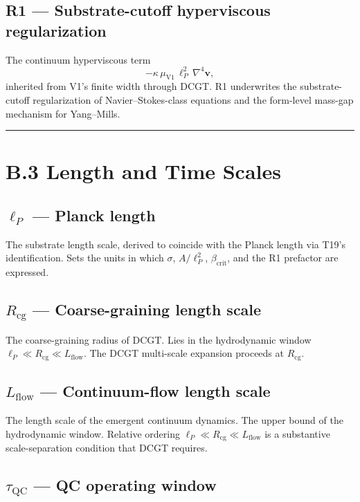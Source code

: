 \documentclass[11pt]{book}
\begin{document}
\subsection{R1 — Substrate-cutoff hyperviscous regularization}

The continuum hyperviscous term
\[
-\kappa\,\mu_\mathrm{V1}\,\ell_P^2\,\nabla^4\mathbf{v},
\]
inherited from V1's finite width through DCGT. R1 underwrites the substrate-cutoff regularization of Navier–Stokes-class equations and the form-level mass-gap mechanism for Yang–Mills.

\bigskip\hrule\bigskip

\section{B.3 Length and Time Scales}

\subsection{$\ell_P$ — Planck length}

The substrate length scale, derived to coincide with the Planck length via T19's identification. Sets the units in which $\sigma$, $A/\ell_P^2$, $\beta_\mathrm{crit}$, and the R1 prefactor are expressed.

\subsection{$R_\mathrm{cg}$ — Coarse-graining length scale}

The coarse-graining radius of DCGT. Lies in the hydrodynamic window $\ell_P \ll R_\mathrm{cg} \ll L_\mathrm{flow}$. The DCGT multi-scale expansion proceeds at $R_\mathrm{cg}$.

\subsection{$L_\mathrm{flow}$ — Continuum-flow length scale}

The length scale of the emergent continuum dynamics. The upper bound of the hydrodynamic window. Relative ordering $\ell_P \ll R_\mathrm{cg} \ll L_\mathrm{flow}$ is a substantive scale-separation condition that DCGT requires.

\subsection{$\tau_\mathrm{QC}$ — QC operating window}
\end{document}
